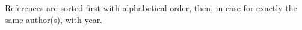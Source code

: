 \starttitle [title={References}]

References are sorted first with alphabetical order, then, in case for exactly the same author(s), with year.
\bigskip





\stoptitle

